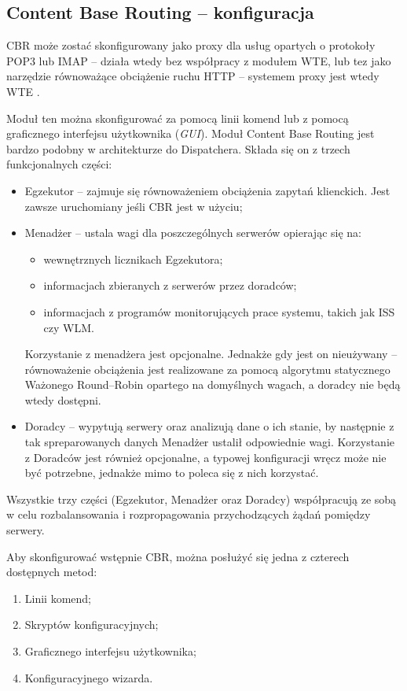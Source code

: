 \subsection{Content Base Routing -- konfiguracja}

CBR może zostać skonfigurowany jako proxy dla usług opartych o protokoły POP3 lub IMAP -- działa wtedy bez współpracy
z modułem WTE, lub tez jako narzędzie równoważące obciążenie ruchu HTTP -- systemem proxy jest wtedy WTE  \cite{NDUsersGuide}.

Moduł ten można skonfigurować za pomocą linii komend lub z pomocą graficznego interfejsu użytkownika
(\emph{GUI}). Moduł Content Base Routing jest bardzo podobny w architekturze do Dispatchera. Składa się on z trzech
funkcjonalnych części:
    \begin{itemize}
    \item Egzekutor -- zajmuje się równoważeniem obciążenia zapytań klienckich. Jest zawsze uruchomiany jeśli CBR
    jest w użyciu;
    \item Menadżer -- ustala wagi dla poszczególnych serwerów opierając się na:
        \begin{itemize}
        \item wewnętrznych licznikach Egzekutora;
        \item informacjach zbieranych z serwerów przez doradców;
        \item informacjach z programów monitorujących prace systemu, takich jak ISS czy WLM.
        \end{itemize}
        Korzystanie z menadżera jest opcjonalne. Jednakże gdy jest on nieużywany -- równoważenie obciążenia jest
        realizowane za pomocą algorytmu statycznego Ważonego Round--Robin opartego na domyślnych wagach, a
        doradcy nie będą wtedy dostępni.
    \item Doradcy -- wypytują serwery oraz analizują dane o ich stanie, by następnie z tak spreparowanych danych
    Menadżer ustalił odpowiednie wagi. Korzystanie z Doradców jest również opcjonalne, a typowej konfiguracji wręcz
    może nie być potrzebne, jednakże mimo to poleca się z nich korzystać.
    \end{itemize}

Wszystkie trzy części (Egzekutor, Menadżer oraz Doradcy) współpracują ze sobą w celu rozbalansowania i
rozpropagowania przychodzących żądań pomiędzy serwery.

Aby skonfigurować wstępnie CBR, można posłużyć się jedna z czterech dostępnych metod:
    \begin{enumerate}
    \item Linii komend;
    \item Skryptów konfiguracyjnych;
    \item Graficznego interfejsu użytkownika;
    \item Konfiguracyjnego wizarda.
    \end{enumerate}

